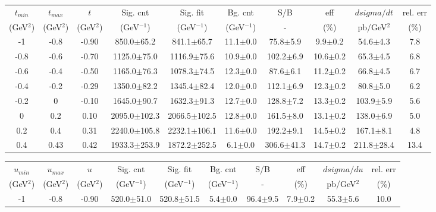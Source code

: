 \begin{landscape}
\begin{table}[hbpt]
  \begin{center}
    \begin{tabular}{|c|c|c|c|c|c|c|c|c|c|}
      \hline
      $t_{min}$ & $t_{max}$ & $t$ & Sig. cnt & Sig. fit & Bg. cnt & S/B & eff & $dsigma/dt$ & rel. err \\ 
      (GeV$^{2}$) & (GeV$^{2}$) & (GeV$^{2}$) & (GeV$^{-1}$) & (GeV$^{-1}$) & (GeV$^{-1}$) & - & (\%) & pb/GeV$^{2}$ & (\%) \\	
      \hline
 -1 & -0.8 & -0.90 & 850.0$\pm$65.2 &  841.1$\pm$65.7 &  11.1$\pm$0.0 &  75.8$\pm$5.9 & 9.9$\pm$0.2 &  54.6$\pm$4.3 & 7.8 \\ 
 \hline 
 -0.8 & -0.6 & -0.70 & 1125.0$\pm$75.0 &  1116.9$\pm$75.6 &  10.9$\pm$0.0 &  102.2$\pm$6.9 & 10.6$\pm$0.2 &  65.3$\pm$4.5 & 6.8 \\ 
 \hline 
 -0.6 & -0.4 & -0.50 & 1165.0$\pm$76.3 &  1078.3$\pm$74.5 &  12.3$\pm$0.0 &  87.6$\pm$6.1 & 11.2$\pm$0.2 &  66.8$\pm$4.5 & 6.7 \\ 
 \hline 
 -0.4 & -0.2 & -0.29 & 1350.0$\pm$82.2 &  1345.4$\pm$82.4 &  12.0$\pm$0.0 &  112.1$\pm$6.9 & 12.3$\pm$0.2 &  80.8$\pm$5.0 & 6.2 \\ 
 \hline 
 -0.2 & 0 & -0.10 & 1645.0$\pm$90.7 &  1632.3$\pm$91.3 &  12.7$\pm$0.0 &  128.8$\pm$7.2 & 13.3$\pm$0.2 &  103.9$\pm$5.9 & 5.6 \\ 
 \hline 
 0 & 0.2 & 0.10 & 2095.0$\pm$102.3 &  2066.5$\pm$102.5 &  12.8$\pm$0.0 &  161.5$\pm$8.0 & 13.1$\pm$0.2 &  138.0$\pm$6.9 & 5.0 \\ 
 \hline 
 0.2 & 0.4 & 0.31 & 2240.0$\pm$105.8 &  2232.1$\pm$106.1 &  11.6$\pm$0.0 &  192.2$\pm$9.1 & 14.5$\pm$0.2 &  167.1$\pm$8.1 & 4.8 \\ 
 \hline 
 0.4 & 0.43 & 0.42 & 1933.3$\pm$253.9 &  1872.2$\pm$252.5 &  6.1$\pm$0.0 &  306.6$\pm$41.3 & 14.7$\pm$0.2 &  211.8$\pm$28.4 & 13.4 \\ 
 \hline 
    \end{tabular}
    \begin{tabular}{|c|c|c|c|c|c|c|c|c|c|}
      \hline
      $u_{min}$ & $u_{max}$ & $u$ & Sig. cnt & Sig. fit & Bg. cnt & S/B & eff & $dsigma/du$ & rel. err \\ 
      (GeV$^{2}$) & (GeV$^{2}$) & (GeV$^{2}$) & (GeV$^{-1}$) & (GeV$^{-1}$) & (GeV$^{-1}$) & - & (\%) & pb/GeV$^{2}$ & (\%) \\	
      \hline
 -1 & -0.8 & -0.90 & 520.0$\pm$51.0 &  520.8$\pm$51.5 &  5.4$\pm$0.0 &  96.4$\pm$9.5 & 7.9$\pm$0.2 &  55.3$\pm$5.6 & 10.0 \\ 

\end{tabular}
\end{center}
\end{table}
\end{landscape}
